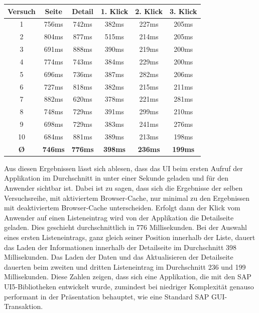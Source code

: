 \vspace{1em}
\begin{center}
  \begin{tabular}{ | c | c | c | c | c | c | }
  \hline
  \textbf{Versuch}
  & \textbf{Seite} & \textbf{Detail} & \textbf{1. Klick} & \textbf{2. Klick} & \textbf{3. Klick}\\
  \hline \hline
  1 & 756ms & 742ms & 382ms & 227ms & 205ms\\
  \hline
  2 & 804ms & 877ms & 515ms & 214ms & 205ms\\
  \hline
  3 & 691ms & 888ms & 390ms & 219ms & 200ms\\
  \hline
  4 & 774ms & 743ms & 384ms & 229ms & 200ms\\
  \hline
  5 & 696ms & 736ms & 387ms & 282ms & 206ms\\
  \hline
  6 & 727ms & 818ms & 382ms & 215ms & 211ms\\
  \hline
  7 & 882ms & 620ms & 378ms & 221ms & 281ms\\
  \hline
  8 & 748ms & 729ms & 391ms & 299ms & 210ms\\
  \hline
  9 & 698ms & 729ms & 383ms & 241ms & 276ms\\
  \hline
  10 & 684ms & 881ms & 389ms & 213ms & 198ms\\
  \hline \hline
  \textbf{\O} & \textbf{746ms} & \textbf{776ms} & \textbf{398ms} & \textbf{236ms} & \textbf{199ms}\\
  \hline
  \end{tabular}
\label{tab:uiloading}
\end{center}

Aus diesen Ergebnissen lässt sich ablesen, dass das UI beim ersten Aufruf der Applikation im Durchschnitt in unter einer Sekunde geladen und für den Anwender sichtbar ist. Dabei ist zu sagen, dass sich die Ergebnisse der selben Versuchsreihe, mit aktiviertem Browser-Cache, nur minimal zu den Ergebnissen mit deaktiviertem Browser-Cache unterscheiden. Erfolgt dann der Klick vom Anwender auf einen Listeneintrag wird von der Applikation die Detailseite geladen. Dies geschieht durchschnittlich in 776 Millisekunden. Bei der Auswahl eines ersten Listeneintrags, ganz gleich seiner Position innerhalb der Liste, dauert das Laden der Informationen innerhalb der Detailseite im Durchschnitt 398 Millisekunden. Das Laden der Daten und das Aktualisieren der Detailseite dauerten beim zweiten und dritten Listeneintrag im Durchschnitt 236 und 199 Millisekunden. Diese Zahlen zeigen, dass sich eine Applikation, die mit den SAP UI5-Bibliotheken entwickelt wurde, zumindest bei niedriger Komplexität genauso performant in der Präsentation behauptet, wie eine Standard SAP GUI-Transaktion.
